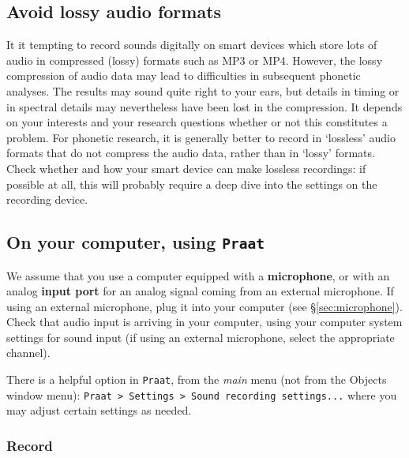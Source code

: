 \documentclass[
]{book}
\begin{document}
\subsection{Avoid lossy audio formats}\label{sec:avoidlossyformats}

It it tempting to record sounds digitally on smart devices which store lots of audio in compressed (lossy) formats such as MP3 or MP4. However, the lossy compression of audio data may lead to difficulties in subsequent phonetic analyses. The results may sound quite right to your ears, but details in timing or in spectral details may nevertheless have been lost in the compression. It depends on your interests and your research questions whether or not this constitutes a problem.
For phonetic research, it is generally better to record in `lossless' audio formats that do not compress the audio data, rather than in `lossy' formats. Check whether and how your smart device can make lossless recordings: if possible at all, this will probably require a deep dive into the settings on the recording device.

\subsection{\texorpdfstring{On your computer, using \texttt{Praat}}{On your computer, using Praat}}\label{on-your-computer-using-praat}

We assume that you use a computer equipped with a \textbf{microphone}, or with an analog \textbf{input port} for an analog signal coming from an external microphone. If using an external microphone, plug it into your computer (see §\ref{sec:microphone}). Check that audio input is arriving in your computer, using your computer system settings for sound input (if using an external microphone, select the appropriate channel).

There is a helpful option in \texttt{Praat}, from the \emph{main} menu (not from the Objects window menu): \texttt{Praat\ \textgreater{}\ Settings\ \textgreater{}\ Sound\ recording\ settings...} where you may adjust certain settings as needed.

\label{box-praatrecord}
\subsubsection{Record}\label{sec:praatrecord}
\end{document}
